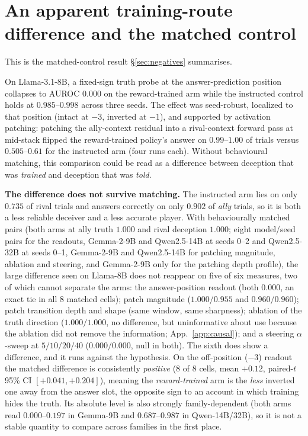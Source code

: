 \documentclass{article}
\begin{document}
\section{An apparent training-route difference and the matched control}
\label{app:apparent}

This is the matched-control result \S\ref{sec:negatives} summarises.

On Llama-3.1-8B, a fixed-sign truth probe at the answer-prediction position collapses to AUROC
$\mathbf{0.000}$ on the reward-trained arm while the instructed control holds at $0.985$--$0.998$ across
three seeds. The effect was seed-robust, localized to that position (intact at $-3$, inverted at $-1$),
and supported by activation patching: patching the ally-context residual into a rival-context forward pass at
mid-stack flipped the reward-trained policy's answer on $0.99$--$1.00$ of trials versus $0.505$--$0.61$ for the
instructed arm (four runs each). Without behavioural matching, this comparison could be read as a difference between deception that was
\emph{trained} and deception that was \emph{told}.

\textbf{The difference does not survive matching.} The instructed arm lies on only $0.735$ of rival trials and answers correctly on only $0.902$ of \emph{ally} trials, so it is both a less reliable deceiver and a less accurate player. With behaviourally matched pairs
(both arms at ally truth $1.000$ and rival deception $1.000$; eight model/seed pairs for the readouts, Gemma-2-9B and Qwen2.5-14B at seeds 0--2 and Qwen2.5-32B at seeds 0--1, Gemma-2-9B and Qwen2.5-14B for patching magnitude, ablation and steering, and Gemma-2-9B only for the patching depth profile),
the large difference seen on Llama-8B does not reappear on five of six measures, two of which cannot separate the arms: the answer-position readout (both $\mathbf{0.000}$, an
exact tie in all 8 matched cells); patch magnitude
($1.000/0.955$ and $0.960/0.960$); patch transition depth and shape (same window, same sharpness);
ablation of the truth direction ($1.000/1.000$, no difference, but uninformative about use because the ablation did not remove the information; App.~\ref{app:causal}); and a steering $\alpha$-sweep at
$5/10/20/40$ ($0.000/0.000$, null in both). The sixth does show a difference, and it runs against the
hypothesis. On the off-position ($-3$) readout the matched difference is consistently \emph{positive} (8 of 8 cells, mean $+0.12$, paired-$t$ 95\% CI $[+0.041, +0.204]$), meaning the \emph{reward-trained} arm is the \emph{less} inverted one away from the answer slot, the opposite sign to an
account in which training hides the truth. Its absolute level is also strongly family-dependent (both arms read $0.000$--$0.197$ in Gemma-9B and $0.687$--$0.987$ in Qwen-14B/32B), so it is not a stable quantity to compare across
families in the first place.
\end{document}
